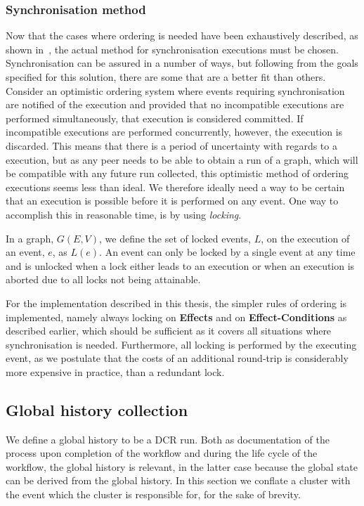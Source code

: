 \documentclass{article}
\begin{document}
    \subsubsection{Synchronisation method}
    \label{subsubsec:synchronisation-method}

	Now that the cases where ordering is needed have been exhaustively described, as shown in~\cite{debois_concurrency_2015}, the actual method for synchronisation executions must be chosen.
	Synchronisation can be assured in a number of ways, but following from the goals specified for this solution, there are some that are a better fit than others.
	Consider an optimistic ordering system where events requiring synchronisation are notified of the execution and provided that no incompatible executions are performed simultaneously, that execution is considered committed.
	If incompatible executions are performed concurrently, however, the execution is discarded.
	This means that there is a period of uncertainty with regards to a execution, but as any peer needs to be able to obtain a run of a graph, which will be compatible with any future run collected, this optimistic method of ordering executions seems less than ideal.
	We therefore ideally need a way to be certain that an execution is possible before it is performed on any event.
	One way to accomplish this in reasonable time, is by using \textit{locking}.

	In a graph, $G(E,V)$, we define the set of locked events, $L$, on the execution of an event, $e$, as $L(e)$.
	An event can only be locked by a single event at any time and is unlocked when a lock either leads to an execution or when an execution is aborted due to all locks not being attainable.

	For the implementation described in this thesis, the simpler rules of ordering is implemented, namely always locking on \textbf{Effects} and on \textbf{Effect-Conditions} as described earlier, which should be sufficient as it covers all situations where synchronisation is needed.
	Furthermore, all locking is performed by the executing event, as we postulate that the costs of an additional round-trip is considerably more expensive in practice, than a redundant lock.

	\subsection{Global history collection}
	\label{subsec:global-history-collection}

	We define a global history to be a DCR run.
	Both as documentation of the process upon completion of the workflow and during the life cycle of the workflow, the global history is relevant, in the latter case because the global state can be derived from the global history.
	In this section we conflate a cluster with the event which the cluster is responsible for, for the sake of brevity.
\end{document}
